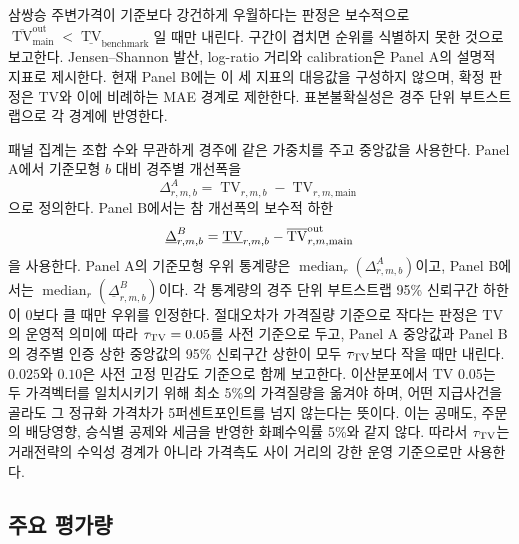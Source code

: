 삼쌍승 주변가격이 기준보다 강건하게 우월하다는 판정은 보수적으로
$\overline{\operatorname{TV}}^{\mathrm{out}}_{\mathrm{main}}
 <\underline{\operatorname{TV}}_{\mathrm{benchmark}}$일 때만 내린다. 구간이 겹치면 순위를
식별하지 못한 것으로 보고한다. Jensen--Shannon 발산, log-ratio 거리와
calibration은 Panel A의 설명적 지표로 제시한다. 현재 Panel B에는 이 세 지표의
대응값을 구성하지 않으며, 확정 판정은 TV와 이에 비례하는 MAE 경계로 제한한다.
표본불확실성은 경주 단위 부트스트랩으로 각 경계에 반영한다.

패널 집계는 조합 수와 무관하게 경주에 같은 가중치를 주고 중앙값을 사용한다.
Panel A에서 기준모형 $b$ 대비 경주별 개선폭을
\[
  \Delta^A_{r,m,b}
  =\operatorname{TV}_{r,m,b}-\operatorname{TV}_{r,m,\mathrm{main}}
\]
으로 정의한다. Panel B에서는 참 개선폭의 보수적 하한
\[
  \underline\Delta^B_{r,m,b}
  =\underline{\operatorname{TV}}_{r,m,b}
   -\overline{\operatorname{TV}}^{\rm out}_{r,m,\mathrm{main}}
\]
을 사용한다. Panel A의 기준모형 우위 통계량은
$\operatorname{median}_r(\Delta^A_{r,m,b})$이고, Panel B에서는
$\operatorname{median}_r(\underline\Delta^B_{r,m,b})$이다. 각 통계량의 경주
단위 부트스트랩 95\% 신뢰구간 하한이 0보다 클 때만 우위를 인정한다. 절대오차가 가격질량
기준으로 작다는 판정은 TV의 운영적 의미에 따라 $\tau_{\rm TV}=0.05$를 사전 기준으로
두고, Panel A 중앙값과 Panel B의 경주별 인증 상한 중앙값의 95\% 신뢰구간
상한이 모두 $\tau_{\rm TV}$보다 작을 때만 내린다. $0.025$와 $0.10$은 사전
고정 민감도 기준으로 함께 보고한다. 이산분포에서 TV 0.05는 두 가격벡터를
일치시키기 위해 최소 5\%의 가격질량을 옮겨야 하며, 어떤 지급사건을 골라도 그
정규화 가격차가 5퍼센트포인트를 넘지 않는다는 뜻이다. 이는 공매도, 주문의
배당영향, 승식별 공제와 세금을 반영한 화폐수익률 5\%와 같지 않다. 따라서
$\tau_{\rm TV}$는 거래전략의 수익성 경계가 아니라 가격측도 사이 거리의 강한
운영 기준으로만 사용한다.

\subsection{주요 평가량}

